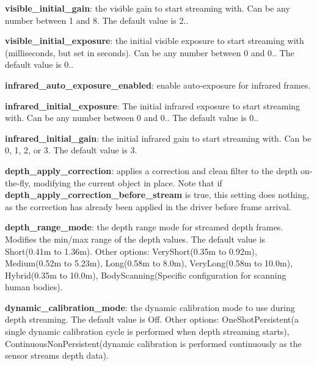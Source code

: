 \begin{DoxyItemize}
\item {\bfseries{visible\+\_\+initial\+\_\+gain}}\+: the visible gain to start streaming with. Can be any number between 1 and 8. The default value is 2..
\item {\bfseries{visible\+\_\+initial\+\_\+exposure}}\+: the initial visible exposure to start streaming with (milliseconds, but set in seconds). Can be any number between 0 and 0.. The default value is 0..
\item {\bfseries{infrared\+\_\+auto\+\_\+exposure\+\_\+enabled}}\+: enable auto-\/exposure for infrared frames.
\item {\bfseries{infrared\+\_\+initial\+\_\+exposure}}\+: The initial infrared exposure to start streaming with. Can be any number between 0 and 0.. The default value is 0..
\item {\bfseries{infrared\+\_\+initial\+\_\+gain}}\+: the initial infrared gain to start streaming with. Can be 0, 1, 2, or 3. The default value is 3.
\item {\bfseries{depth\+\_\+apply\+\_\+correction}}\+: applies a correction and clean filter to the depth on-\/the-\/fly, modifying the current object in place. Note that if {\bfseries{depth\+\_\+apply\+\_\+correction\+\_\+before\+\_\+stream}} is true, this setting does nothing, as the correction has already been applied in the driver before frame arrival.
\item {\bfseries{depth\+\_\+range\+\_\+mode}}\+: the depth range mode for streamed depth frames. Modifies the min/max range of the depth values. The default value is Short(0.\+41m to 1.\+36m). Other options\+: Very\+Short(0.\+35m to 0.\+92m), Medium(0.\+52m to 5.\+23m), Long(0.\+58m to 8.\+0m), Very\+Long(0.\+58m to 10.\+0m), Hybrid(0.\+35m to 10.\+0m), Body\+Scanning(\+Specific configuration for scanning human bodies).
\item {\bfseries{dynamic\+\_\+calibration\+\_\+mode}}\+: the dynamic calibration mode to use during depth streaming. The default value is Off. Other options\+: One\+Shot\+Persistent(a single dynamic calibration cycle is performed when depth streaming starts), Continuous\+Non\+Persistent(dynamic calibration is performed continuously as the sensor streams depth data). 
\end{DoxyItemize}